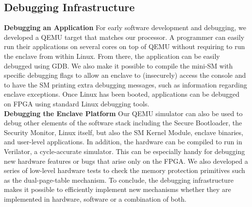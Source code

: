 \subsection{Debugging Infrastructure}
\noindent\textbf{Debugging an Application}
For early software development and debugging, we developed a QEMU target that matches our processor.
A programmer can easily run their applications on several cores on top of QEMU without requiring to run the enclave from within Linux.
From there, the application can be easily debugged using GDB.
We also make it possible to compile the mini-SM with specific debugging flags to allow an enclave to (insecurely) access the console and to have the SM printing extra debugging messages, such as information regarding enclave exceptions.
Once Linux has been booted, applications can be debugged on FPGA using standard Linux debugging tools.
\\

\noindent\textbf{Debugging the Enclave Platform}
Our QEMU simulator can also be used to debug other elements of the software stack including the Secure Bootloader, the Security Monitor, Linux itself, but also the SM Kernel Module, enclave binaries, and user-level applications.
In addition, the hardware can be compiled to run in Verilator, a cycle-accurate simulator.
This can be especially handy for debugging new hardware features or bugs that arise only on the FPGA.
We also developed a series of low-level hardware tests to check the memory protection primitives such as the dual-page-table mechanism.
To conclude, the debugging infrastructure makes it possible to efficiently implement new mechanisms whether they are implemented in hardware, software or a combination of both.